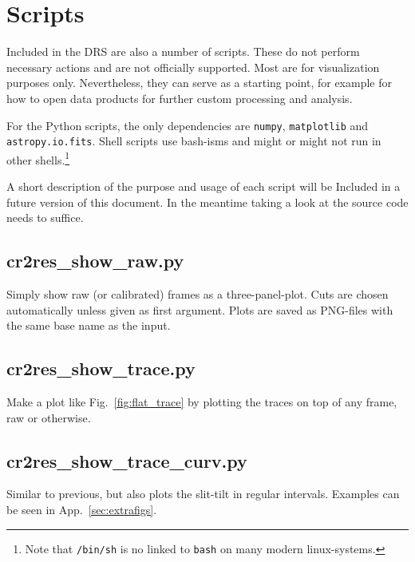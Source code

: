 \section{Scripts}
\label{sec:scripts}

Included in the DRS are also a number of scripts. These do not perform necessary
actions and are not officially supported. Most are for visualization purposes
only. Nevertheless, they can serve as a starting point, for example for how to
open data products for further custom processing and analysis.

For the Python scripts, the only dependencies are \texttt{numpy}, \texttt{matplotlib} and \texttt{astropy.io.fits}. Shell scripts use bash-isms and might
or might not run in other shells.\footnote{Note that \texttt{/bin/sh} is no linked to \texttt{bash} on many modern linux-systems.}

A short description of the purpose and usage of each script will be Included
in a future version of this document. In the meantime taking a look at the source code needs to suffice.


\subsection{cr2res\_show\_raw.py}
Simply show raw (or calibrated) frames as a three-panel-plot. Cuts are chosen automatically unless given as first argument. Plots are saved as PNG-files with the same base name as the input.
\begin{shell}
\end{shell}

\subsection{cr2res\_show\_trace.py}
Make a plot like Fig.~\ref{fig:flat_trace} by plotting the traces on top of any
frame, raw or otherwise.

\subsection{cr2res\_show\_trace\_curv.py}
Similar to previous, but also plots the slit-tilt in regular intervals. Examples can be seen in App.~\ref{sec:extrafigs}.

